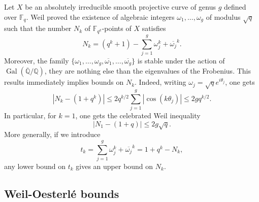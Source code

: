 \documentclass{amsart}
\newcommand{\F}{\mathbb{F}}
\newcommand{\Q}{\mathbb{Q}}
\DeclareMathOperator{\Gal}{Gal}
\begin{document}
Let $X$ be an absolutely irreducible smooth projective curve of genus $g$ defined over $\F_q$. 
Weil proved the existence of algebraic integers $\omega_1, \ldots, \omega_g$ of modulus $\sqrt{q}$ such that the number $N_k$ of $\F_{q^k}$-points of $X$ satisfies
\[
N_k  = \left(q^k+1\right) - \sum_{j=1}^g \omega_j^k + \overline{\omega_j}^k.
\]
Moreover, the family $\{ \omega_1, \ldots, \omega_g, \overline{\omega_1}, \ldots, \overline{\omega_g} \}$ is stable under the action of $\Gal(\overline{\Q}/\Q)$, they are nothing else than the eigenvalues of the Frobenius.
This results immediately implies bounds on $N_k$. 
Indeed, writing $\omega_j = \sqrt{q}e^{i\theta_j}$, one gets
\[
\left| N_k - (1+q^k) \right| \leq 2q^{k/2}\sum_{j=1}^g \left| \cos(k\theta_j) \right| \leq 2gq^{k/2}. 
\]
In particular, for $k=1$, one gets the celebrated Weil inequality
\begin{equation}\label{eq:Weil1}
\left| N_1 - (1+q) \right| \leq 2g\sqrt{q}.
\end{equation}
More generally, if we introduce 
\begin{equation}\label{eq:deftk}
t_k = \sum_{j=1}^g \omega_j^k + \overline{\omega_j}^k = 1+q^k - N_k,
\end{equation}
any lower bound on $t_k$ gives an upper bound on $N_k$. 

\subsection{Weil-Oesterl\'e bounds} \label{sWn}
\end{document}
